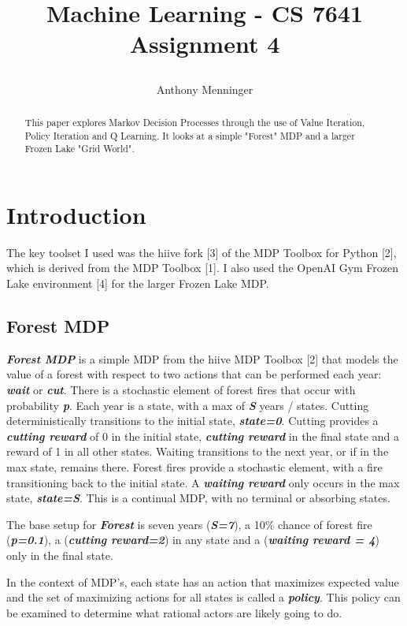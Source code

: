 \documentclass[letterpaper]{article} %
\title{
Machine Learning - CS 7641
Assignment 4
	
}
\author {
    Anthony Menninger \\
}
\begin{document}
\maketitle

\begin{abstract}
This paper explores Markov Decision Processes through the use of Value Iteration, Policy Iteration and Q Learning.  It looks at a simple "Forest" MDP and a larger Frozen Lake "Grid World".
\end{abstract}

\section{Introduction}


The key toolset I used was the hiive fork [3] of the MDP Toolbox for Python [2], which is derived from the MDP Toolbox [1].  I also used the OpenAI Gym Frozen Lake environment [4] for the larger Frozen Lake MDP.

\subsection{Forest MDP}
\textbf{\emph{Forest MDP}} is a simple MDP from the hiive MDP Toolbox [2] that models the value of a forest with respect to two actions that can be performed each year: \textbf{\emph{wait}} or \textbf{\emph{cut}}.  There is a stochastic element of forest fires that occur with probability \textbf{\emph{p}}.  Each year is a state, with a max of \textbf{\emph{S}} years / states.  Cutting deterministically transitions to the initial state,  \textbf{\emph{state=0}}.  Cutting provides a \textbf{\emph{cutting reward}} of 0 in the initial state, \textbf{\emph{cutting reward}} in the final state and a reward of 1 in all other states.  Waiting transitions to the next year, or if in the max state, remains there.  Forest fires provide a stochastic element, with a fire transitioning back to the initial state.  A \textbf{\emph{waiting reward}} only occurs in the max state, \textbf{\emph{state=S}}.  This is a continual MDP, with no terminal or absorbing states. 

The base setup for \textbf{\emph{Forest}} is seven years (\textbf{\emph{S=7}}), a 10\% chance of forest fire (\textbf{\emph{p=0.1}}), a  (\textbf{\emph{cutting reward=2}}) in any state and a (\textbf{\emph{waiting reward = 4}}) only in the final state.

In the context of MDP's, each state has an action that maximizes expected value and the set of maximizing actions for all states is called a \textbf{\emph{policy}}.  This policy can be examined to determine what rational actors are likely going to do. 
\end{document}
